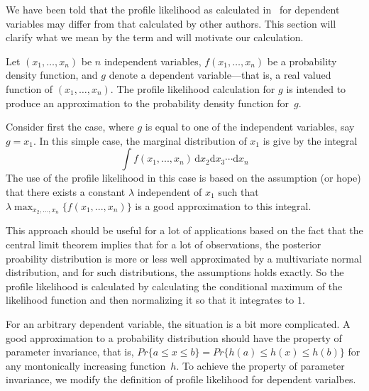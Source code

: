 \documentclass{admbmanual}
\begin{document}
We have been told that the profile likelihood as calculated in \ADM\
for dependent variables may differ from that calculated by other authors.
This section will clarify what we mean by the term and will motivate our
calculation.  

Let $(x_1,\ldots,x_n)$ be $n$ independent variables, $f(x_1,\ldots,x_n)$
be a probability density function, and
$g$ denote a dependent variable---that is, a real valued function of 
$(x_1,\ldots,x_n)$. The profile likelihood calculation for $g$
is intended to produce an approximation to the probability density
function for~$g$.

Consider first the case, where $g$ is equal to one of the independent
variables, say $g=x_1$. In this simple case, the marginal distribution of
$x_1$ is give by the integral
\begin{equation}
  \int f(x_1,..., x_n)\, \textrm{d}x_2\textrm{d}x_3\cdots \textrm{d}x_n
\end{equation}
The use of the profile likelihood in this case is based on the assumption 
(or hope) that
there exists a constant $\lambda$ independent of $x_1$ such that
$\lambda \max_{x_2,\ldots,x_n} \{f(x_1,..., x_n)\}$ is a good approximation
to this integral.

This approach should be useful for a lot of applications based on the fact that
the central limit theorem implies that for a lot of observations, the
posterior proability distribution is more or less well approximated by
a multivariate normal distribution, and for such distributions, the
assumptions holds exactly.
So the profile likelihood is calculated by calculating the conditional maximum of the 
likelihood function and then normalizing it so that it integrates to $1$.

For an arbitrary dependent variable, the situation is a bit more
complicated. A good approximation to a probability distribution should
have the property of parameter invariance, that is,
$Pr \{a\le x\le b\}=Pr \{h(a)\le h(x)\le h(b)\}$ for any montonically 
increasing function~$h$.
To achieve the property of parameter invariance, we modify the
definition of profile likelihood for dependent varialbes.
\end{document}
